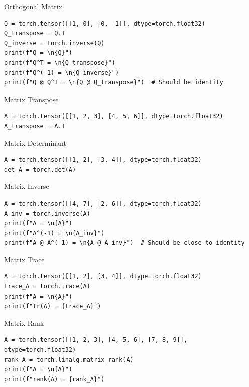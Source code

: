 \documentclass[aspectratio=169,xcolor=dvipsnames,svgnames,x11names,fleqn]{beamer}
\begin{document}
\begin{frame}[containsverbatim]{Orthogonal Matrix}
\begin{verbatim}
Q = torch.tensor([[1, 0], [0, -1]], dtype=torch.float32)
Q_transpose = Q.T
Q_inverse = torch.inverse(Q)
print(f"Q = \n{Q}")
print(f"Q^T = \n{Q_transpose}")
print(f"Q^(-1) = \n{Q_inverse}")
print(f"Q @ Q^T = \n{Q @ Q_transpose}")  # Should be identity
\end{verbatim}
\end{frame}

\begin{frame}[containsverbatim]{Matrix Transpose}
\begin{verbatim}
A = torch.tensor([[1, 2, 3], [4, 5, 6]], dtype=torch.float32)
A_transpose = A.T
\end{verbatim}
\end{frame}


\begin{frame}[containsverbatim]{Matrix Determinant}
\begin{verbatim}
A = torch.tensor([[1, 2], [3, 4]], dtype=torch.float32)
det_A = torch.det(A)
\end{verbatim}
\end{frame}



\begin{frame}[containsverbatim]{Matrix Inverse}
\begin{verbatim}
A = torch.tensor([[4, 7], [2, 6]], dtype=torch.float32)
A_inv = torch.inverse(A)
print(f"A = \n{A}")
print(f"A^(-1) = \n{A_inv}")
print(f"A @ A^(-1) = \n{A @ A_inv}")  # Should be close to identity
\end{verbatim}
\end{frame}


\begin{frame}[containsverbatim]{Matrix Trace}
\begin{verbatim}
A = torch.tensor([[1, 2], [3, 4]], dtype=torch.float32)
trace_A = torch.trace(A)
print(f"A = \n{A}")
print(f"tr(A) = {trace_A}")
\end{verbatim}
\end{frame}


\begin{frame}[containsverbatim]{Matrix Rank}
\begin{verbatim}
A = torch.tensor([[1, 2, 3], [4, 5, 6], [7, 8, 9]], dtype=torch.float32)
rank_A = torch.linalg.matrix_rank(A)
print(f"A = \n{A}")
print(f"rank(A) = {rank_A}")
\end{verbatim}
\end{frame}
\end{document}
